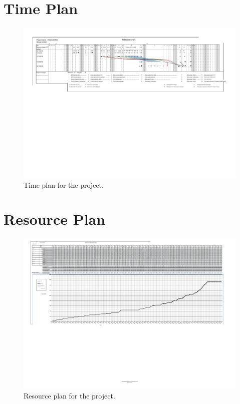 \documentclass[11pt, titlepage]{article} %
\begin{document}
\section{Time Plan}
\begin{figure}
     \centering
     \includegraphics[scale=0.6]{timeplan.pdf}
     \caption{Time plan for the project.}
     \label{fig:timeplan}
\end{figure}

\section{Resource Plan}
\begin{figure}
     \centering
     \includegraphics[scale=0.8]{resource_plan.pdf}
     \caption{Resource plan for the project.}
     \label{fig:resource_plan}
 \end{figure}
\end{document}

